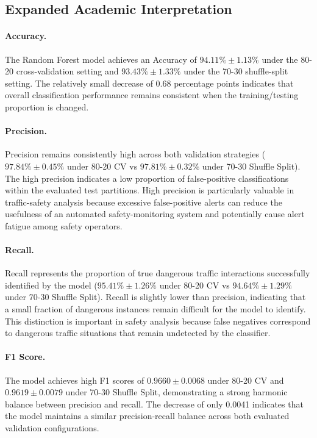 \documentclass[12pt,a4paper]{report}
\begin{document}
\subsection{Expanded Academic Interpretation}

\paragraph{Accuracy.}
The Random Forest model achieves an Accuracy of $94.11\% \pm 1.13\%$ under the 80-20 cross-validation setting and $93.43\% \pm 1.33\%$ under the 70-30 shuffle-split setting. The relatively small decrease of 0.68 percentage points indicates that overall classification performance remains consistent when the training/testing proportion is changed.

\paragraph{Precision.}
Precision remains consistently high across both validation strategies ($97.84\% \pm 0.45\%$ under 80-20 CV vs $97.81\% \pm 0.32\%$ under 70-30 Shuffle Split). The high precision indicates a low proportion of false-positive classifications within the evaluated test partitions. High precision is particularly valuable in traffic-safety analysis because excessive false-positive alerts can reduce the usefulness of an automated safety-monitoring system and potentially cause alert fatigue among safety operators.

\paragraph{Recall.}
Recall represents the proportion of true dangerous traffic interactions successfully identified by the model ($95.41\% \pm 1.26\%$ under 80-20 CV vs $94.64\% \pm 1.29\%$ under 70-30 Shuffle Split). Recall is slightly lower than precision, indicating that a small fraction of dangerous instances remain difficult for the model to identify. This distinction is important in safety analysis because false negatives correspond to dangerous traffic situations that remain undetected by the classifier.

\paragraph{F1 Score.}
The model achieves high F1 scores of $0.9660 \pm 0.0068$ under 80-20 CV and $0.9619 \pm 0.0079$ under 70-30 Shuffle Split, demonstrating a strong harmonic balance between precision and recall. The decrease of only 0.0041 indicates that the model maintains a similar precision-recall balance across both evaluated validation configurations.
\end{document}
